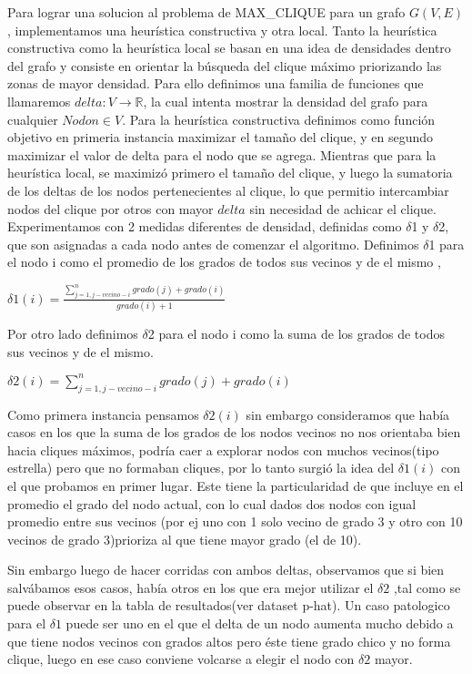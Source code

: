 Para lograr una solucion al problema de MAX\_CLIQUE para un grafo $G(V,E)$, implementamos una heurística constructiva y otra local. Tanto la heurística constructiva como la heurística local se basan en una idea de densidades dentro del grafo y consiste en orientar la búsqueda del clique máximo priorizando las zonas de mayor densidad. Para ello definimos una familia de funciones que llamaremos $delta: V \longrightarrow \mathbb R$, la cual intenta mostrar la densidad del grafo para cualquier $Nodo n \in V$.
Para la heurística constructiva definimos como función objetivo en primeria instancia maximizar el tamaño del clique, y en segundo maximizar el valor de delta para el nodo que se agrega. Mientras que para la heurística local, se maximizó primero el tamaño del clique, y luego la sumatoria de los deltas de los nodos pertenecientes al clique, lo que permitio intercambiar nodos del clique por otros con mayor $delta$ sin necesidad de achicar el clique.
Experimentamos con 2 medidas diferentes de densidad, definidas como $\delta$1 y $\delta$2, que son asignadas a cada nodo antes de comenzar el algoritmo.
Definimos $\displaystyle \delta$1 para el nodo i  como el promedio de los grados de todos sus vecinos y de el mismo ,

   $\displaystyle \delta1(i) = \frac{\sum_{j=1,j-vecino-i}^{n} grado(j) + grado(i)}{grado(i)+1} $

Por otro lado definimos $\displaystyle \delta$2 para el nodo i como la suma de los grados de todos sus vecinos y de el mismo. 
	
   $\displaystyle \delta2(i) = {\sum_{j=1,j-vecino-i}^{n} grado(j) + grado(i)}$

Como primera instancia pensamos $ \delta2(i)$ sin embargo consideramos que había casos en los que la suma de los grados de los nodos vecinos no nos orientaba bien hacia cliques máximos, podría caer a explorar nodos con muchos vecinos(tipo estrella) pero que no formaban cliques, por lo tanto surgió la idea del $ \delta1(i)$ con el que probamos en primer lugar.
Este tiene la particularidad de que incluye en el promedio el grado del nodo actual, con lo cual dados dos nodos con igual promedio entre sus vecinos (por ej uno con 1 solo vecino de grado 3 y otro con 10 vecinos de grado 3)prioriza al que tiene mayor grado (el de 10). 

Sin embargo luego de hacer corridas con ambos deltas, observamos que si bien salvábamos esos casos, había otros en los que era mejor utilizar el  $ \delta2$ ,tal como se puede observar en la tabla de resultados(ver dataset p-hat). 
Un caso patologico para el $\delta1$ puede ser uno en el que el delta de un nodo aumenta mucho debido a que tiene nodos vecinos con grados altos pero éste tiene grado chico y no forma clique, luego en ese caso conviene volcarse a elegir el nodo con $ \delta2$ mayor.
